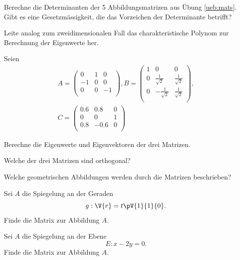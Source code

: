 \documentclass[%
11pt,%
twoside,%
titlepage,%
german,%
headsepline%
]{scrartcl}
\begin{document}
\begin{ueb}
Berechne
die Determinanten der 5 Abbildungsmatrizen aus \"Ubung \ref{ueb:mats}. Gibt es eine Gesetzmässigkeit, die das Vorzeichen der Determinante betrifft?
\end{ueb}

\begin{ueb}
Leite analog zum zweidimensionalen Fall das charakteristische Polynom zur Berechnung der Eigenwerte her.
\end{ueb}

\begin{ueb}
Seien
\begin{gather*}
A=
\begin{pmatrix}
0&1&0\\
-1&0&0\\
0&0&-1\\
\end{pmatrix}
, B=
\begin{pmatrix}
1&0&0\\
0&\frac{1}{\sqrt{2}}&\frac{1}{\sqrt{2}}\\
0&-\frac{1}{\sqrt{2}}&\frac{1}{\sqrt{2}}\\
\end{pmatrix},
\\[2ex]
C=
\begin{pmatrix}
0.6&0.8&0\\
0&0&1\\
0.8&-0.6&0\\
\end{pmatrix}
\end{gather*}

\begin{enumeratea}
\item Berechne die Eigenwerte und Eigenvektoren der drei Matrizen.
\item Welche der drei Matrizen sind orthogonal?
\item Welche geometrischen Abbildungen werden durch die Matrizen beschrieben?
\end{enumeratea}
\end{ueb}

\begin{ueb}
Sei $A$ die Spiegelung an der Geraden
$$g:\V{r}=t\pV{1}{1}{0}.$$
Finde die Matrix zur Abbildung $A$.
\end{ueb}

\begin{ueb}
Sei $A$ die Spiegelung an der Ebene
$$E:x-2y=0.$$
Finde die Matrix zur Abbildung $A$.
\end{ueb}
\end{document}
